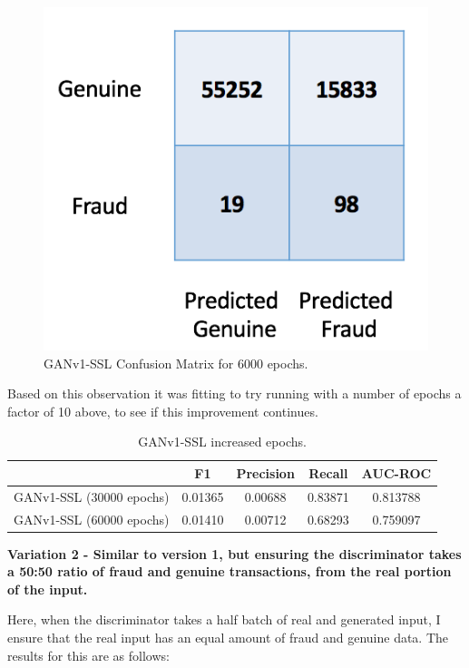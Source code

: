 \documentclass[12pt,a4paper,twoside]{report}
\begin{document}
\begin{figure}[H]
\centering
\includegraphics[scale=0.6]{ganv1-ssl-cm-6000}
\caption{GANv1-SSL Confusion Matrix for 6000 epochs.}
\label{fig:ganv1-ssl-cm-6000}
\end{figure}

Based on this observation it was fitting to try running with a number of epochs a factor of 10 above, to see if this improvement continues. 

\begin{table}[H]  
  \centering
  \begin{tabular}{ccccc}
    \toprule
           		& F1 & Precision & Recall & AUC-ROC \\ \midrule
    GANv1-SSL (30000 epochs) & 0.01365  &  0.00688 & 0.83871  & 0.813788 \\
    GANv1-SSL (60000 epochs) & 0.01410   &   0.00712 & 0.68293 & 0.759097  \\
   
   \bottomrule
 \end{tabular}
 \caption{GANv1-SSL increased epochs.}
\label{table:ganv1-ssl-original-2}
\end{table}

\textbf{Variation 2 - Similar to version 1, but ensuring the discriminator takes a 50:50 ratio of fraud and genuine transactions, from the real portion of the input.}

Here, when the discriminator takes a half batch of real and generated input, I ensure that the real input has an equal amount of fraud and genuine data. The results for this are as follows:
\end{document}
